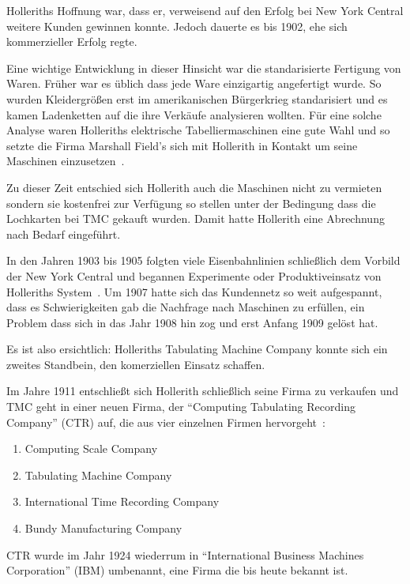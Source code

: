 \documentclass[parskip=half]{scrartcl}
\begin{document}
Holleriths Hoffnung war, dass er, verweisend auf den Erfolg bei New York
Central weitere Kunden gewinnen konnte. Jedoch dauerte es bis 1902, ehe sich
kommerzieller Erfolg regte.

Eine wichtige Entwicklung in dieser Hinsicht war die standarisierte Fertigung
von Waren. Früher war es üblich dass jede Ware einzigartig angefertigt wurde.
So wurden Kleidergrößen erst im amerikanischen Bürgerkrieg standarisiert und es
kamen Ladenketten auf die ihre Verkäufe analysieren wollten. Für eine solche
Analyse waren Holleriths elektrische Tabelliermaschinen eine gute Wahl und so
setzte die Firma Marshall Field's sich mit Hollerith in Kontakt um seine
Maschinen einzusetzen~\cite{austrian1982herman}.

Zu dieser Zeit entschied sich Hollerith auch die Maschinen nicht zu vermieten
sondern sie kostenfrei zur Verfügung so stellen unter der Bedingung dass die
Lochkarten bei TMC gekauft wurden. Damit hatte Hollerith eine Abrechnung nach
Bedarf eingeführt.

In den Jahren 1903 bis 1905 folgten viele Eisenbahnlinien schließlich dem
Vorbild der New York Central und begannen Experimente oder Produktiveinsatz von
Holleriths System~\cite{austrian1982herman}. Um 1907 hatte sich das Kundennetz
so weit aufgespannt, dass es Schwierigkeiten gab die Nachfrage nach Maschinen
zu erfüllen, ein Problem dass sich in das Jahr 1908 hin zog und erst Anfang
1909 gelöst hat.

Es ist also ersichtlich: Holleriths Tabulating Machine Company konnte sich ein
zweites Standbein, den komerziellen Einsatz schaffen.

Im Jahre 1911 entschließt sich Hollerith schließlich seine Firma zu verkaufen
und TMC geht in einer neuen Firma, der \enquote{Computing Tabulating Recording
Company} (CTR) auf, die aus vier einzelnen Firmen
hervorgeht~\cite{austrian1982herman}:

\begin{enumerate}
  \item Computing Scale Company
  \item Tabulating Machine Company
  \item International Time Recording Company
  \item Bundy Manufacturing Company
\end{enumerate}

CTR wurde im Jahr 1924 wiederrum in \enquote{International Business Machines
Corporation} (IBM) umbenannt, eine Firma die bis heute bekannt ist.
\end{document}
